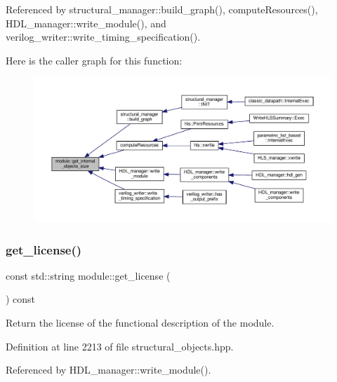 Referenced by structural\+\_\+manager\+::build\+\_\+graph(), compute\+Resources(), H\+D\+L\+\_\+manager\+::write\+\_\+module(), and verilog\+\_\+writer\+::write\+\_\+timing\+\_\+specification().

Here is the caller graph for this function\+:
\nopagebreak
\begin{figure}[H]
\begin{center}
\leavevmode
\includegraphics[width=350pt]{d0/dd3/classmodule_a4ddb109ccb130b31471a7648dbcf5352_icgraph}
\end{center}
\end{figure}
\mbox{\label{classmodule_ab552447118d780e217d9f3e38a5711cc}} 
\subsubsection{\texorpdfstring{get\+\_\+license()}{get\_license()}}
{\footnotesize\ttfamily const std\+::string module\+::get\+\_\+license (\begin{DoxyParamCaption}{ }\end{DoxyParamCaption}) const\hspace{0.3cm}{\ttfamily [inline]}}



Return the license of the functional description of the module. 



Definition at line 2213 of file structural\+\_\+objects.\+hpp.



Referenced by H\+D\+L\+\_\+manager\+::write\+\_\+module().

